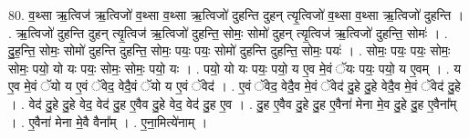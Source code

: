 \documentclass[17pt]{extarticle}
\begin{document}
80. व॒थ्सा ऋ॒त्विज॑ ऋ॒त्विजो॑ व॒थ्सा व॒थ्सा ऋ॒त्विजो॑ दुहन्ति दुहन् त्यृ॒त्विजो॑ व॒थ्सा व॒थ्सा ऋ॒त्विजो॑ दुहन्ति । . ऋ॒त्विजो॑ दुहन्ति दुहन् त्यृ॒त्विज॑ ऋ॒त्विजो॑ दुहन्ति॒ सोमः॒ सोमो॑ दुहन् त्यृ॒त्विज॑ ऋ॒त्विजो॑ दुहन्ति॒ सोमः॑ । . दु॒ह॒न्ति॒ सोमः॒ सोमो॑ दुहन्ति दुहन्ति॒ सोमः॒ पयः॒ पयः॒ सोमो॑ दुहन्ति दुहन्ति॒ सोमः॒ पयः॑ । . सोमः॒ पयः॒ पयः॒ सोमः॒ सोमः॒ पयो॒ यो यः पयः॒ सोमः॒ सोमः॒ पयो॒ यः । . पयो॒ यो यः पयः॒ पयो॒ य ए॒व मे॒वं ॅयः पयः॒ पयो॒ य ए॒वम् । . य ए॒व मे॒वं ॅयो य ए॒वं ॅवेद॒ वेदै॒वं ॅयो य ए॒वं ॅवेद॑ । . ए॒वं ॅवेद॒ वेदै॒व मे॒वं ॅवेद॑ दु॒हे दु॒हे वेदै॒व मे॒वं ॅवेद॑ दु॒हे । . वेद॑ दु॒हे दु॒हे वेद॒ वेद॑ दु॒ह ए॒वैव दु॒हे वेद॒ वेद॑ दु॒ह ए॒व । . दु॒ह ए॒वैव दु॒हे दु॒ह ए॒वैना॑ मेना मे॒व दु॒हे दु॒ह ए॒वैना᳚म् । . ए॒वैना॑ मेना मे॒वै वैना᳚म् । . ए॒ना॒मित्ये॑नाम् । \newline
\pagebreak
\end{document}
